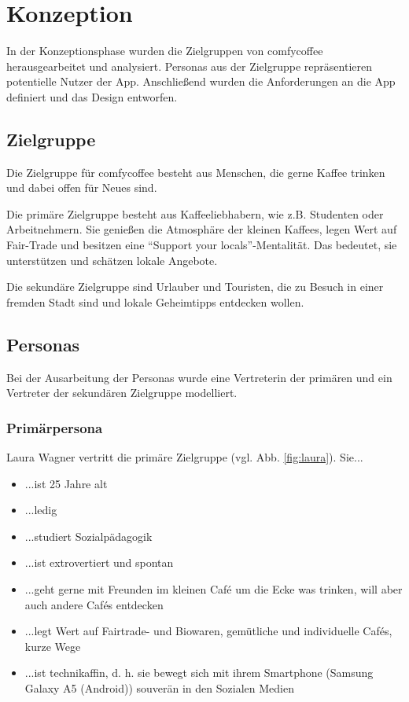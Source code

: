\chapter{Konzeption}
\label{konzeption}
In der Konzeptionsphase wurden die Zielgruppen von comfycoffee herausgearbeitet und analysiert. Personas aus der Zielgruppe repräsentieren potentielle Nutzer der App. Anschließend wurden die Anforderungen an die App definiert und das Design entworfen.

\section{Zielgruppe}
Die Zielgruppe für comfycoffee besteht aus Menschen, die gerne Kaffee trinken und dabei offen für Neues sind.

Die primäre Zielgruppe besteht aus Kaffeeliebhabern, wie z.B. Studenten oder Arbeitnehmern. Sie genießen die Atmosphäre der kleinen Kaffees, legen Wert auf Fair-Trade und besitzen eine ``Support your locals''-Mentalität. Das bedeutet, sie unterstützen und schätzen lokale Angebote.

Die sekundäre Zielgruppe sind Urlauber und Touristen, die zu Besuch in einer fremden Stadt sind und lokale Geheimtipps entdecken wollen.

\section{Personas}
Bei der Ausarbeitung der Personas wurde eine Vertreterin der primären und ein Vertreter der sekundären Zielgruppe modelliert.

\subsection{Primärpersona}
Laura Wagner vertritt die primäre Zielgruppe (vgl. Abb. \ref{fig:laura}). Sie...
\begin{itemize}
	\item ...ist 25 Jahre alt
	\item ...ledig
	\item ...studiert Sozialpädagogik
	\item ...ist extrovertiert und spontan
	\item ...geht gerne mit Freunden im kleinen Café um die Ecke was trinken, will aber auch andere Cafés entdecken
	\item ...legt Wert auf Fairtrade- und Biowaren, gemütliche und individuelle Cafés, kurze Wege
	\item ...ist technikaffin, d. h. sie bewegt sich mit ihrem Smartphone (Samsung Galaxy A5 (Android)) souverän in den Sozialen Medien
\end{itemize}

